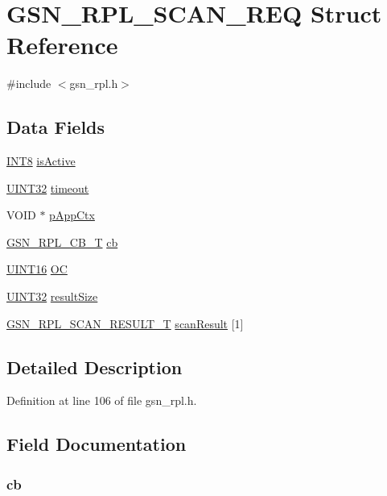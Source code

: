 \hypertarget{a00209}{
\section{GSN\_\-RPL\_\-SCAN\_\-REQ Struct Reference}
\label{a00209}
}


{\ttfamily \#include $<$gsn\_\-rpl.h$>$}

\subsection*{Data Fields}
\begin{DoxyCompactItemize}
\item 
\hyperlink{a00660_ga307b8734c020247f6bac4fcde0dcfbb9}{INT8} \hyperlink{a00209_a5c6504268568d5da5f361d3b6f914c51}{isActive}
\item 
\hyperlink{a00660_gae1e6edbbc26d6fbc71a90190d0266018}{UINT32} \hyperlink{a00209_a89d0e080863509070eee6b8c7a2333c1}{timeout}
\item 
VOID $\ast$ \hyperlink{a00209_a05a138152af2aedc27575fbb40a5236a}{pAppCtx}
\item 
\hyperlink{a00579_aed305ee504daf71b35d8db4dfd6d3de3}{GSN\_\-RPL\_\-CB\_\-T} \hyperlink{a00209_a11c5694810e4c9f40335359c6383ea21}{cb}
\item 
\hyperlink{a00660_ga09f1a1fb2293e33483cc8d44aefb1eb1}{UINT16} \hyperlink{a00209_a9aaa1e0a8619ea489c65aac22afbd4ad}{OC}
\item 
\hyperlink{a00660_gae1e6edbbc26d6fbc71a90190d0266018}{UINT32} \hyperlink{a00209_a7e3f3db32adc602424589dfc462fd1a3}{resultSize}
\item 
\hyperlink{a00210}{GSN\_\-RPL\_\-SCAN\_\-RESULT\_\-T} \hyperlink{a00209_a7663fdcd4e756dbfbf23bb2c3aba911b}{scanResult} \mbox{[}1\mbox{]}
\end{DoxyCompactItemize}


\subsection{Detailed Description}


Definition at line 106 of file gsn\_\-rpl.h.



\subsection{Field Documentation}
\hypertarget{a00209_a11c5694810e4c9f40335359c6383ea21}{
\subsubsection[{cb}]{ {\bf cb}}}
\label{a00209_a11c5694810e4c9f40335359c6383ea21}


